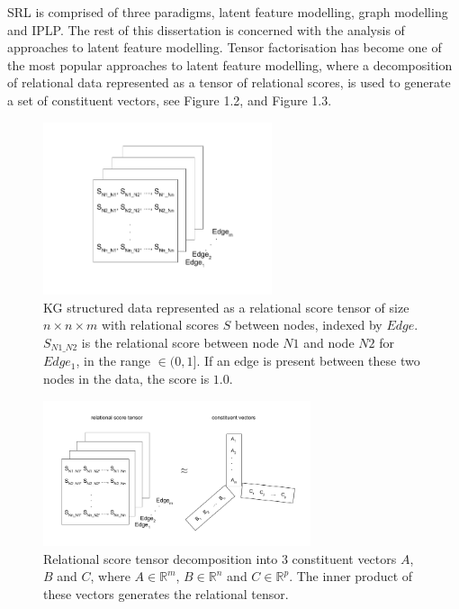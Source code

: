 \noindent SRL is comprised of three paradigms, latent feature modelling, graph modelling and IPLP. The rest of this dissertation is concerned with the analysis of approaches to latent feature modelling. Tensor factorisation has become one of the most popular approaches to latent feature modelling, where a decomposition of relational data represented as a tensor of relational scores, is used to generate a set of constituent vectors, see Figure 1.2, and Figure 1.3. \par

\begin{figure}[H]
   	\centering
    	\includegraphics[width=0.6\textwidth, height=0.3\textheight]{relational_tensor.png}
	\captionsetup{justification=centering}
	\caption{KG structured data represented as a relational score tensor of size $ n \times n \times m $ with relational scores $ S $ between nodes, indexed by $ Edge $. $ S_{N1\_N2} $ is the relational score between node $ N1 $ and node $ N2 $ for $ Edge_1 $, in the range $ \in (0, 1] $. If an edge is present between these two nodes in the data, the score is $ 1.0 $.}
\end{figure}

\begin{figure}[H]
   	\centering
    	\includegraphics[width=0.7\textwidth, height=0.4\textwidth]{relational_tensor_decomposition}
	\captionsetup{justification=centering}
	\caption{Relational score tensor decomposition into $ 3 $ constituent vectors $ A $, $ B $ and $ C $, where $ A \in \mathbb{R}^m $,  $ B \in \mathbb{R}^n $ and $ C \in \mathbb{R}^p $. The inner product of these vectors generates the relational tensor.}
\end{figure}

